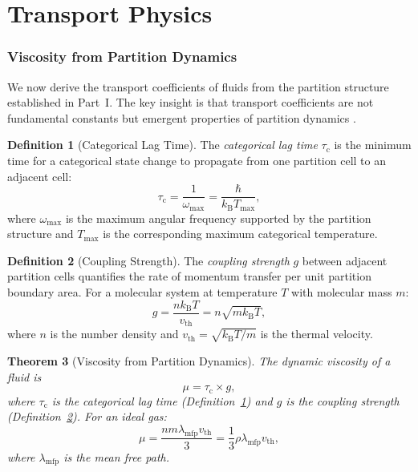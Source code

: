 \documentclass[11pt,twocolumn,a4paper]{article}
\theoremstyle{plain}
\newtheorem{theorem}{Theorem}[section]
\theoremstyle{definition}
\newtheorem{definition}[theorem]{Definition}
\theoremstyle{remark}
\newcommand{\kB}{k_{\mathrm{B}}}
\newcommand{\tauc}{\tau_{\mathrm{c}}}
\begin{document}
\part{Transport Physics}
\label{part:transport}

\section{Viscosity from Partition Dynamics}
\label{sec:viscosity}

We now derive the transport coefficients of fluids from the partition structure established in Part~I. The key insight is that transport coefficients are not fundamental constants but emergent properties of partition dynamics \cite{sachikonye2026equations}.

\begin{definition}[Categorical Lag Time]
\label{def:tauc}
The \emph{categorical lag time} $\tauc$ is the minimum time for a categorical state change to propagate from one partition cell to an adjacent cell:
\begin{equation}
\tauc = \frac{1}{\omega_{\max}} = \frac{\hbar}{\kB T_{\max}},
\label{eq:tauc}
\end{equation}
where $\omega_{\max}$ is the maximum angular frequency supported by the partition structure and $T_{\max}$ is the corresponding maximum categorical temperature.
\end{definition}

\begin{definition}[Coupling Strength]
\label{def:coupling}
The \emph{coupling strength} $g$ between adjacent partition cells quantifies the rate of momentum transfer per unit partition boundary area. For a molecular system at temperature $T$ with molecular mass $m$:
\begin{equation}
g = \frac{n \kB T}{v_{\mathrm{th}}} = n \sqrt{m \kB T},
\label{eq:coupling}
\end{equation}
where $n$ is the number density and $v_{\mathrm{th}} = \sqrt{\kB T / m}$ is the thermal velocity.
\end{definition}

\begin{theorem}[Viscosity from Partition Dynamics]
\label{thm:viscosity}
The dynamic viscosity of a fluid is
\begin{equation}
\mu = \tauc \times g,
\label{eq:viscosity}
\end{equation}
where $\tauc$ is the categorical lag time (Definition~\ref{def:tauc}) and $g$ is the coupling strength (Definition~\ref{def:coupling}). For an ideal gas:
\begin{equation}
\mu = \frac{n m \lambda_{\mathrm{mfp}} v_{\mathrm{th}}}{3} = \frac{1}{3} \rho \lambda_{\mathrm{mfp}} v_{\mathrm{th}},
\label{eq:viscosity_gas}
\end{equation}
where $\lambda_{\mathrm{mfp}}$ is the mean free path.
\end{theorem}
\end{document}
